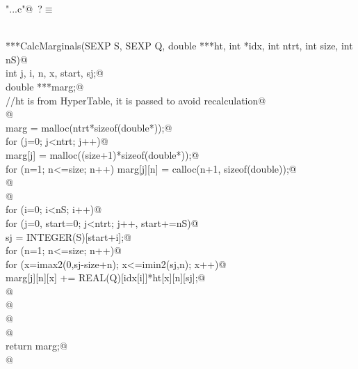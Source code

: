 \documentclass[reqno]{amsart}
\renewcommand{\NWtarget}[2]{\hypertarget{#1}{#2}}
\begin{document}
\begin{flushleft} \small\label{scrap24}\raggedright\small
\NWtarget{nuweb?}{} \verb@"..\src\ReprodCalcs.c"@\nobreak\ {\footnotesize {?}}$\equiv$
\vspace{-1ex}
\begin{list}{}{} \item
\mbox{}\verb@@\\
\mbox{}\verb@double ***CalcMarginals(SEXP S, SEXP Q, double ***ht, int *idx, int ntrt, int size, int nS){@\\
\mbox{}\verb@   int j, i, n, x, start, sj;@\\
\mbox{}\verb@         double ***marg;@\\
\mbox{}\verb@         //ht is from HyperTable, it is passed to avoid recalculation@\\
\mbox{}\verb@         @\\
\mbox{}\verb@         marg = malloc(ntrt*sizeof(double*));@\\
\mbox{}\verb@         for (j=0; j<ntrt; j++){@\\
\mbox{}\verb@                 marg[j] = malloc((size+1)*sizeof(double*));@\\
\mbox{}\verb@                 for (n=1; n<=size; n++) marg[j][n] = calloc(n+1, sizeof(double));@\\
\mbox{}\verb@         }@\\
\mbox{}\verb@         @\\
\mbox{}\verb@         for (i=0; i<nS; i++){@\\
\mbox{}\verb@                 for (j=0, start=0; j<ntrt; j++, start+=nS){@\\
\mbox{}\verb@                         sj = INTEGER(S)[start+i];@\\
\mbox{}\verb@                         for (n=1; n<=size; n++){@\\
\mbox{}\verb@                                 for (x=imax2(0,sj-size+n); x<=imin2(sj,n); x++){@\\
\mbox{}\verb@                                         marg[j][n][x] += REAL(Q)[idx[i]]*ht[x][n][sj];@\\
\mbox{}\verb@                                 }@\\
\mbox{}\verb@                         }@\\
\mbox{}\verb@                 }@\\
\mbox{}\verb@         }@\\
\mbox{}\verb@  return marg;@\\
\mbox{}\verb@ }@\\

\end{list}
\end{flushleft}
\end{document}
